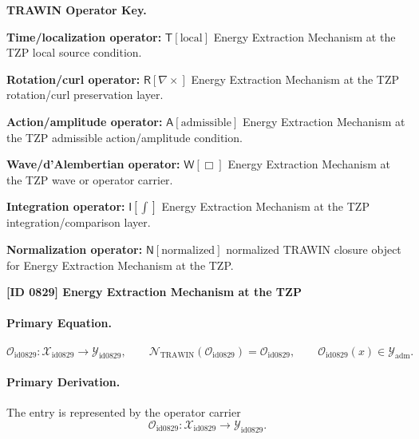 \par\vspace{0.45\baselineskip}
\noindent\begin{minipage}[t]{\linewidth}
\begingroup
\small
\raggedright
\textbf{TRAWIN Operator Key.}\par
\noindent\textbf{Time/localization operator:} $\mathsf{T}\!\left[\mathrm{local}\right]$ Energy Extraction Mechanism at the TZP local source condition.\par
\noindent\textbf{Rotation/curl operator:} $\mathsf{R}\!\left[\nabla\times\right]$ Energy Extraction Mechanism at the TZP rotation/curl preservation layer.\par
\noindent\textbf{Action/amplitude operator:} $\mathsf{A}\!\left[\mathrm{admissible}\right]$ Energy Extraction Mechanism at the TZP admissible action/amplitude condition.\par
\noindent\textbf{Wave/d'Alembertian operator:} $\mathsf{W}\!\left[\Box\right]$ Energy Extraction Mechanism at the TZP wave or operator carrier.\par
\noindent\textbf{Integration operator:} $\mathsf{I}\!\left[\int\right]$ Energy Extraction Mechanism at the TZP integration/comparison layer.\par
\noindent\textbf{Normalization operator:} $\mathsf{N}\!\left[\mathrm{normalized}\right]$ normalized TRAWIN closure object for Energy Extraction Mechanism at the TZP.\par
\endgroup
\end{minipage}

\clearpage
\noindent\textbf{[ID 0829] Energy Extraction Mechanism at the TZP}\par
\vspace{0.35em}
\paragraph{Primary Equation.}
\[
\mathcal{O}_{\mathrm{id0829}}:\mathcal{X}_{\mathrm{id0829}}\longrightarrow \mathcal{Y}_{\mathrm{id0829}},\qquad
\mathcal{N}_{\mathrm{TRAWIN}}(\mathcal{O}_{\mathrm{id0829}})=\mathcal{O}_{\mathrm{id0829}},\qquad
\mathcal{O}_{\mathrm{id0829}}(x)\in\mathcal{Y}_{\mathrm{adm}}.
\]

\paragraph{Primary Derivation.} The entry is represented by the operator carrier\[
\mathcal{O}_{\mathrm{id0829}}:\mathcal{X}_{\mathrm{id0829}}\longrightarrow \mathcal{Y}_{\mathrm{id0829}}.
\]

